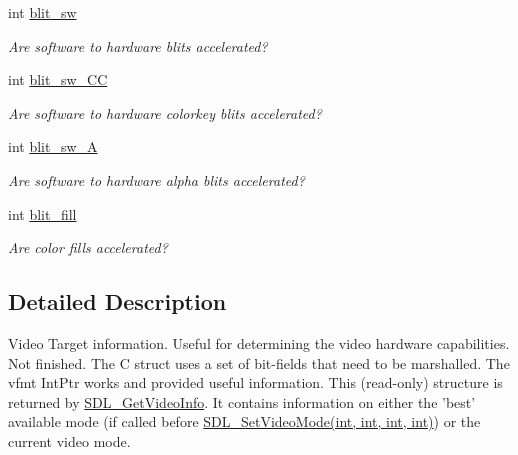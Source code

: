 \begin{DoxyCompactItemize}
int \hyperlink{struct_s_d_l___video_info_aaabd96024f78511efcbec4ed3a4e2fd0}{blit\_\-sw}
\begin{DoxyCompactList}\small\item\em Are software to hardware blits accelerated? \item\end{DoxyCompactList}\item 
int \hyperlink{struct_s_d_l___video_info_a09f1ba992b0b49ab10764fbebf9efc30}{blit\_\-sw\_\-CC}
\begin{DoxyCompactList}\small\item\em Are software to hardware colorkey blits accelerated? \item\end{DoxyCompactList}\item 
int \hyperlink{struct_s_d_l___video_info_ad6560a3d91a5b966e920da055dbb2ba7}{blit\_\-sw\_\-A}
\begin{DoxyCompactList}\small\item\em Are software to hardware alpha blits accelerated? \item\end{DoxyCompactList}\item 
int \hyperlink{struct_s_d_l___video_info_aa4aae0fa07a0f6b5f207dafe7154f391}{blit\_\-fill}
\begin{DoxyCompactList}\small\item\em Are color fills accelerated? \item\end{DoxyCompactList}\end{DoxyCompactItemize}


\subsection{Detailed Description}
Video Target information. Useful for determining the video hardware capabilities. Not finished. The C struct uses a set of bit-\/fields that need to be marshalled. The vfmt IntPtr works and provided useful information. This (read-\/only) structure is returned by \hyperlink{_sdl_8cs_a016732fde2f5c8a5bf71953cc8cba10f}{SDL\_\-GetVideoInfo}. It contains information on either the 'best' available mode (if called before \hyperlink{_sdl_8cs_a961f7efdc2a7ec3860e93140853092f7}{SDL\_\-SetVideoMode(int, int, int, int)}) or the current video mode.

